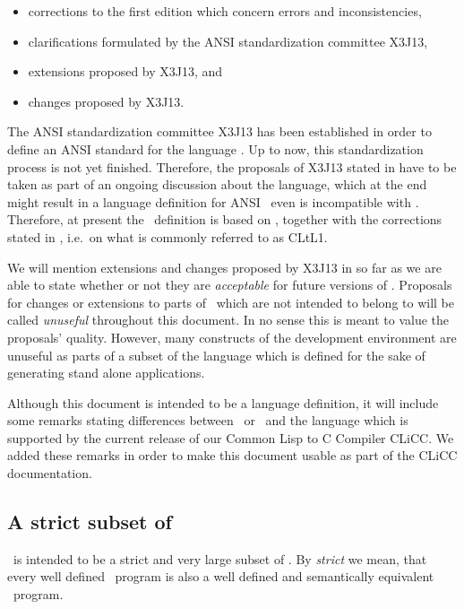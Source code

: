 \begin{itemize}
\item corrections to the first edition which concern errors and inconsistencies,
\item clarifications formulated by the ANSI standardization committee X3J13,
\item extensions proposed by X3J13, and
\item changes proposed by X3J13.
\end{itemize}

The ANSI standardization committee X3J13 has been established in order
to define an ANSI standard for the language \CL. Up to now, this
standardization process is not yet finished. Therefore, the proposals
of X3J13 stated in \cite{Steele90} have to be taken as part of an
ongoing discussion about the language, which at the end might result
in a language definition for ANSI \CL\ even is incompatible with
\cite{Steele90}. Therefore, at present the \ definition is based
on \cite{Steele84}, together with the corrections stated in
\cite{Steele90}, i.e.\ on what is commonly referred to as CLtL1.

We will mention extensions and changes proposed by X3J13 in so far as
we are able to state whether or not they are {\em acceptable} for
future versions of . Proposals for changes or extensions to parts
of \CL\ which are not intended to belong to  will be called {\em
unuseful} throughout this document. In no sense this is meant to value
the proposals' quality. However, many constructs of the development
environment are unuseful as parts of a subset of the language which is
defined for the sake of generating stand alone applications.

Although this document is intended to be a language definition, it
will include some remarks stating differences between \ or \
and the language which is supported by the current release of our
Common Lisp to C Compiler CLiCC. We added these remarks in order to
make this document usable as part of the CLiCC documentation.

\subsection{A strict subset of \CL}

\ is intended to be a strict and very large subset of \CL. By {\em
  strict} we mean, that every well defined \cl0\ program is also a
well defined and semantically equivalent \CL\ program.

